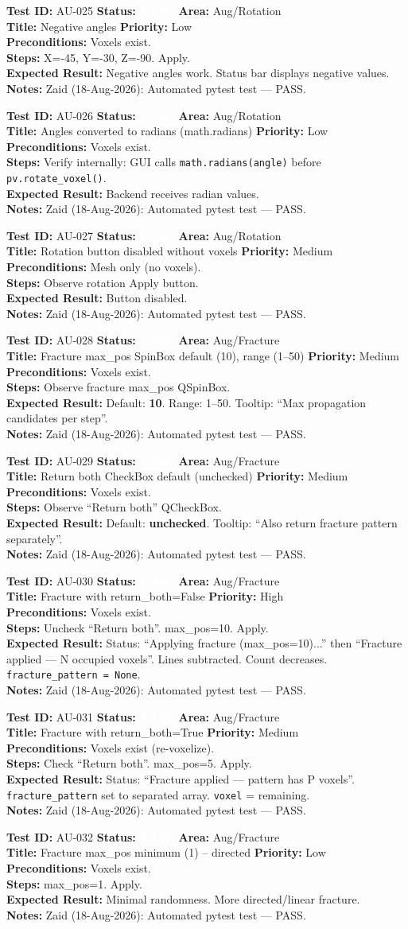 \documentclass[12pt,a4paper]{article}
\newcommand{\statuspass}{\colorbox{statusgreen}{\textcolor{white}{\textbf{\,PASS\,}}}}
\newcommand{\testcase}[9]{%
  \smallskip
  \noindent\textbf{Test ID:} #1 \hfill \textbf{Status:} #2 \hfill \textbf{Area:} #3 \\
  \textbf{Title:} #4 \hfill \textbf{Priority:} #5 \\[0.3em]
  \textbf{Preconditions:} #6 \\[0.3em]
  \textbf{Steps:} #7 \\[0.3em]
  \textbf{Expected Result:} #8 \\
  \textbf{Notes:} #9
  \smallskip
}
\begin{document}
\testcase{AU-025}{\statuspass}{Aug/Rotation}{Negative angles}{Low}{Voxels exist.}{X=-45\textdegree, Y=-30\textdegree, Z=-90\textdegree. Apply.}{Negative angles work. Status bar displays negative values.}{Zaid (18-Aug-2026): Automated pytest test --- PASS.}


\testcase{AU-026}{\statuspass}{Aug/Rotation}{Angles converted to radians (math.radians)}{Low}{Voxels exist.}{Verify internally: GUI calls \texttt{math.radians(angle)} before \texttt{pv.rotate\_voxel()}.}{Backend receives radian values.}{Zaid (18-Aug-2026): Automated pytest test --- PASS.}


\testcase{AU-027}{\statuspass}{Aug/Rotation}{Rotation button disabled without voxels}{Medium}{Mesh only (no voxels).}{Observe rotation Apply button.}{Button disabled.}{Zaid (18-Aug-2026): Automated pytest test --- PASS.}


\testcase{AU-028}{\statuspass}{Aug/Fracture}{Fracture max\_pos SpinBox default (10), range (1--50)}{Medium}{Voxels exist.}{Observe fracture max\_pos QSpinBox.}{Default: \textbf{10}. Range: 1--50. Tooltip: ``Max propagation candidates per step''.}{Zaid (18-Aug-2026): Automated pytest test --- PASS.}


\testcase{AU-029}{\statuspass}{Aug/Fracture}{Return both CheckBox default (unchecked)}{Medium}{Voxels exist.}{Observe ``Return both'' QCheckBox.}{Default: \textbf{unchecked}. Tooltip: ``Also return fracture pattern separately''.}{Zaid (18-Aug-2026): Automated pytest test --- PASS.}


\testcase{AU-030}{\statuspass}{Aug/Fracture}{Fracture with return\_both=False}{High}{Voxels exist.}{Uncheck ``Return both''. max\_pos=10. Apply.}{Status: ``Applying fracture (max\_pos=10)...'' then ``Fracture applied --- N occupied voxels''. Lines subtracted. Count decreases. \texttt{fracture\_pattern = None}.}{Zaid (18-Aug-2026): Automated pytest test --- PASS.}


\testcase{AU-031}{\statuspass}{Aug/Fracture}{Fracture with return\_both=True}{Medium}{Voxels exist (re-voxelize).}{Check ``Return both''. max\_pos=5. Apply.}{Status: ``Fracture applied --- pattern has P voxels''. \texttt{fracture\_pattern} set to separated array. \texttt{voxel} = remaining.}{Zaid (18-Aug-2026): Automated pytest test --- PASS.}


\testcase{AU-032}{\statuspass}{Aug/Fracture}{Fracture max\_pos minimum (1) -- directed}{Low}{Voxels exist.}{max\_pos=1. Apply.}{Minimal randomness. More directed/linear fracture.}{Zaid (18-Aug-2026): Automated pytest test --- PASS.}
\end{document}
